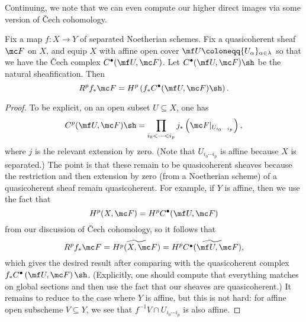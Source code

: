 \documentclass[../notes.tex]{subfiles}
\begin{document}
Continuing, we note that we can even compute our higher direct images via some version of \v Cech cohomology.
\begin{proposition}
	Fix a map $f\colon X\to Y$ of separated Noetherian schemes. Fix a quasicoherent sheaf $\mc F$ on $X$, and equip $X$ with affine open cover $\mf U\coloneqq\{U_\alpha\}_{\alpha\in\lambda}$ so that we have the \v{C}ech complex $C^\bullet(\mf U,\mc F)$. Let $C^\bullet(\mf U,\mc F)\sh$ be the natural sheafification. Then
	\[R^pf_*\mc F=H^p\left(f_*C^\bullet(\mf U,\mc F)\sh\right).\]
\end{proposition}
\begin{proof}
	To be explicit, on an open subset $U\subseteq X$, one has
	\[C^p(\mf U,\mc F)\sh=\prod_{i_0<\cdots<i_p}j_*\left(\mc F|_{U_{i_0\cdots i_p}}\right),\]
	where $j$ is the relevant extension by zero. (Note that $U_{i_0\cdots i_p}$ is affine because $X$ is separated.) The point is that these remain to be quasicoherent sheaves because the restriction and then extension by zero (from a Noetherian scheme) of a quasicoherent sheaf remain quasicoherent. For example, if $Y$ is affine, then we use the fact that
	\[H^p(X,\mc F)=H^pC^\bullet(\mf U,\mc F)\]
	from our discussion of \v Cech cohomology, so it follows that
	\[R^pf_*\mc F=\widetilde{H^p(X,\mc F)}=H^p\widetilde{C^\bullet(\mf U,\mc F)},\]
	which gives the desired result after comparing with the quasicoherent complex $f_*C^\bullet\left(\mf U,\mc F\right)\sh$. (Explicitly, one should compute that everything matches on global sections and then use the fact that our sheaves are quasicoherent.) It remains to reduce to the case where $Y$ is affine, but this is not hard: for affine open subscheme $V\subseteq Y$, we see that $f^{-1}V\cap U_{i_0\cdots i_p}$ is also affine.
\end{proof}
\end{document}
